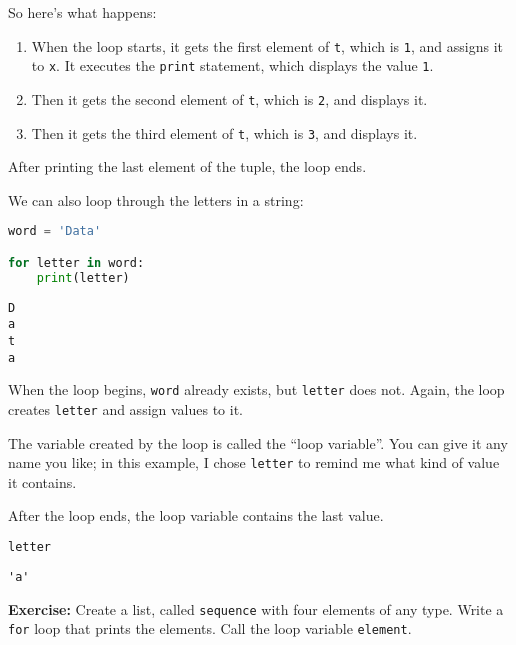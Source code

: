 So here's what happens:

\begin{enumerate}
\def\labelenumi{\arabic{enumi}.}
\item
  When the loop starts, it gets the first element of
  \passthrough{\lstinline!t!}, which is \passthrough{\lstinline!1!}, and
  assigns it to \passthrough{\lstinline!x!}. It executes the
  \passthrough{\lstinline!print!} statement, which displays the value
  \passthrough{\lstinline!1!}.
\item
  Then it gets the second element of \passthrough{\lstinline!t!}, which
  is \passthrough{\lstinline!2!}, and displays it.
\item
  Then it gets the third element of \passthrough{\lstinline!t!}, which
  is \passthrough{\lstinline!3!}, and displays it.
\end{enumerate}

After printing the last element of the tuple, the loop ends.

We can also loop through the letters in a string:

\begin{lstlisting}[language=Python]
word = 'Data'

for letter in word:
    print(letter)
\end{lstlisting}

\begin{lstlisting}[]
D
a
t
a
\end{lstlisting}

When the loop begins, \passthrough{\lstinline!word!} already exists, but
\passthrough{\lstinline!letter!} does not. Again, the loop creates
\passthrough{\lstinline!letter!} and assign values to it.

The variable created by the loop is called the ``loop variable''. You
can give it any name you like; in this example, I chose
\passthrough{\lstinline!letter!} to remind me what kind of value it
contains.

After the loop ends, the loop variable contains the last value.

\begin{lstlisting}[language=Python]
letter
\end{lstlisting}

\begin{lstlisting}[]
'a'
\end{lstlisting}

\textbf{Exercise:} Create a list, called
\passthrough{\lstinline!sequence!} with four elements of any type. Write
a \passthrough{\lstinline!for!} loop that prints the elements. Call the
loop variable \passthrough{\lstinline!element!}.


